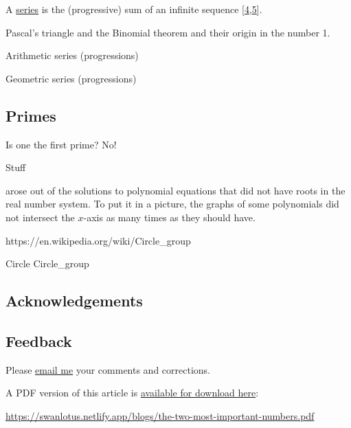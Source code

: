 \documentclass[
  a4paper,
]{article}
\begin{document}
A \href{https://mathworld.wolfram.com/Series.html}{series} is the
(progressive) sum of an infinite sequence
{[}\protect\hyperlink{ref-wikiseries}{4},\protect\hyperlink{ref-wolframseries}{5}{]}.

Pascal's triangle and the Binomial theorem and their origin in the
number 1.

Arithmetic series (progressions)

Geometric series (progressions)

\hypertarget{primes}{%
\subsection{Primes}\label{primes}}

Is one the first prime? No!

Stuff

arose out of the solutions to polynomial equations that did not have
roots in the real number system. To put it in a picture, the graphs of
some polynomials did not intersect the \(x\)-axis as many times as they
should have.

https://en.wikipedia.org/wiki/Circle\_group

Circle Circle\_group

\hypertarget{acknowledgements}{%
\subsection{Acknowledgements}\label{acknowledgements}}

\hypertarget{feedback}{%
\subsection{Feedback}\label{feedback}}

Please \href{mailto:feedback.swanlotus@gmail.com}{email me} your
comments and corrections.

\noindent A PDF version of this article is
\href{./the-two-most-important-numbers.pdf}{available for download
here}:

\begin{small}

\begin{sffamily}

\url{https://swanlotus.netlify.app/blogs/the-two-most-important-numbers.pdf}

\end{sffamily}

\end{small}
\end{document}
